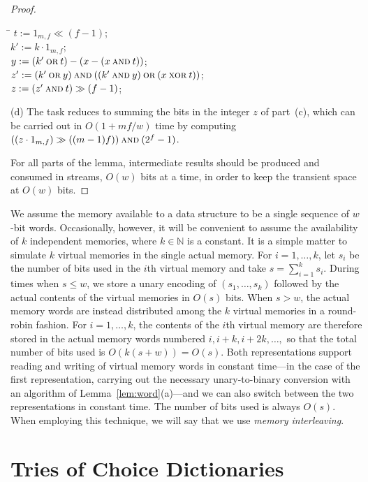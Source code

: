 \documentclass[envcountsame,envcountsect,undated,nolinenumbers]{lnthi}
\def\TbbbN{\mathbb{N}}
\begin{document}
\begin{proof}
\begin{tabbing}
\quad\=\kill
\>$t:=1_{m,f}\ll(f-1)$;\\
\>$k':=k\cdot 1_{m,f}$;\\
\>$y:=(k'\mathbin{\textsc{or}}t)-(x-(x\mathbin{\textsc{and}}t))$;\\
\>$z':=(k'\mathbin{\textsc{or}}y)\mathbin{\textsc{and}}
((k'\mathbin{\textsc{and}}y)\mathbin{\textsc{or}}
(x\mathbin{\textsc{xor}}t))$;\\
\>$z:=(z'\mathbin{\textsc{and}}t)\gg(f-1)$;
\end{tabbing}

(d) The task reduces to summing the
bits in the integer $z$ of part~(c),
which can be carried out in
$O(1+{{m f}/w})$ time by computing
$((z\cdot 1_{m,f})\gg((m-1)f))\mathbin{\textsc{and}}(2^f-1)$.

For all parts of the lemma,
intermediate results should be produced and
consumed in streams, $O(w)$ bits at a time,
in order to keep the transient space at $O(w)$ bits.
\end{proof}

We assume the memory available to a data structure
to be a single sequence of $w$-bit words.
Occasionally, however, it will be convenient to
assume the availability of $k$ independent
memories, where $k\in\TbbbN$ is a constant.
It is a simple matter to simulate $k$ virtual
memories in the single actual memory.
For $i=1,\ldots,k$, let $s_i$ be the number
of bits used in the $i$th virtual memory
and take $s=\sum_{i=1}^k s_i$.
During times when $s\le w$, we store a unary encoding
of $(s_1,\ldots,s_k)$ followed by the actual
contents of the virtual memories in $O(s)$ bits.
When $s>w$, the actual memory words are
instead distributed among the $k$ virtual
memories in a round-robin fashion.
For $i=1,\ldots,k$, the contents of the $i$th
virtual memory are therefore stored in the
actual memory words numbered $i,i+k,i+2 k,\ldots,$
so that the total number of bits used is
$O(k(s+w))=O(s)$.
Both representations support reading and writing
of virtual memory words in constant time---in the
case of the first representation,
carrying out the necessary unary-to-binary conversion
with an algorithm of Lemma~\ref{lem:word}(a)---and
we can also switch between the two representations
in constant time.
The number of bits used is always $O(s)$.
When employing this technique, we will say that we use
\emph{memory interleaving}.

\section{Tries of Choice Dictionaries}
\label{sec:trie}
\end{document}
